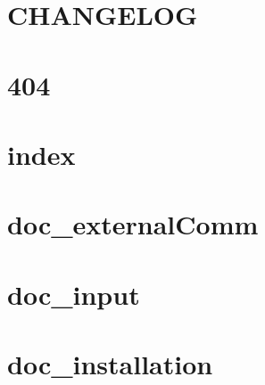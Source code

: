 \documentclass[twoside]{book}
\newcommand{\+}{\discretionary{\mbox{\scriptsize$\hookleftarrow$}}{}{}}
\begin{document}
\chapter{C\+H\+A\+N\+G\+E\+L\+OG}
\label{md__home_carlo_data_GeN-Foam_GeN-Foam_ffn_GeN-Foam_GeN-Foam_FMU4FOAM_ECI4FOAM_CHANGELOG}

\chapter{404}
\label{md__home_carlo_data_GeN-Foam_GeN-Foam_ffn_GeN-Foam_GeN-Foam_FMU4FOAM_ECI4FOAM_docs_404}

\chapter{index}
\label{md__home_carlo_data_GeN-Foam_GeN-Foam_ffn_GeN-Foam_GeN-Foam_FMU4FOAM_ECI4FOAM_docs_index}

\chapter{doc\+\_\+external\+Comm}
\label{md__home_carlo_data_GeN-Foam_GeN-Foam_ffn_GeN-Foam_GeN-Foam_FMU4FOAM_ECI4FOAM_docs_pages_doc_doc_externalComm}

\chapter{doc\+\_\+input}
\label{md__home_carlo_data_GeN-Foam_GeN-Foam_ffn_GeN-Foam_GeN-Foam_FMU4FOAM_ECI4FOAM_docs_pages_doc_doc_input}

\chapter{doc\+\_\+installation}
\label{md__home_carlo_data_GeN-Foam_GeN-Foam_ffn_GeN-Foam_GeN-Foam_FMU4FOAM_ECI4FOAM_docs_pages_doc_doc_installation}

\end{document}

